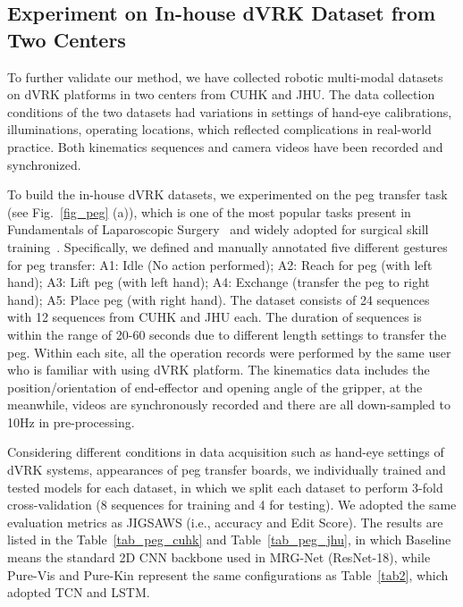 \documentclass[letterpaper, 10 pt, conference]{ieeeconf}
\begin{document}
\subsection{Experiment on In-house dVRK Dataset from Two Centers}

To further validate our method, we have collected robotic multi-modal datasets on dVRK platforms in two centers from CUHK and JHU. The data collection conditions of the two datasets had variations in settings of
hand-eye calibrations, illuminations, operating locations, which reflected complications in real-world practice.
Both kinematics sequences and camera videos have been recorded and synchronized.

To build the in-house dVRK datasets, we experimented on the peg transfer task (see Fig.~\ref{fig_peg} (a)), which is one of the most popular tasks present in Fundamentals of Laparoscopic Surgery~\cite{ritter2007design} and widely adopted for surgical skill training~\cite{joseph2010chopstick}. Specifically, we defined and manually annotated five different gestures for peg transfer:
A1: Idle (No action performed);
A2: Reach for peg (with left hand);
A3: Lift peg (with left hand);
A4: Exchange (transfer the peg to right hand);
A5: Place peg (with right hand).
The dataset consists of 24 sequences with 12 sequences from CUHK and JHU each. The duration of sequences is within the range of 20-60 seconds due to different length settings to transfer the peg.
Within each site, all the operation records were performed by the same user
who is familiar with using dVRK platform. The kinematics data includes the position/orientation of end-effector and opening angle of the gripper, at the meanwhile, videos are synchronously recorded and there are all down-sampled to 10Hz in pre-processing.

Considering different conditions in data acquisition such as hand-eye settings of dVRK systems, appearances of peg transfer boards, we individually trained and tested models for each dataset, in which we split each dataset to perform 3-fold cross-validation (8 sequences for training and 4 for testing).
We adopted the same evaluation metrics as JIGSAWS (i.e., accuracy and Edit Score).
The results are listed in the Table~\ref{tab_peg_cuhk} and Table~\ref{tab_peg_jhu}, in which Baseline means the standard 2D CNN backbone used in MRG-Net (ResNet-18), while Pure-Vis and Pure-Kin represent the same configurations as Table~\ref{tab2}, which adopted TCN and LSTM.
\end{document}
